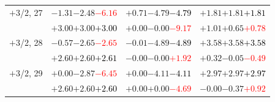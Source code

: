 \documentclass[compress]{beamer}
\begin{document}
\begin{frame}
\begin{tabular}{r | c | c | c}
$+$3/2, 27 & $-1.31$\hspace{0.1 cm}$-2.48$\hspace{0.1 cm}\textcolor{red}{$-6.16$} & $+0.71$\hspace{0.1 cm}$-4.79$\hspace{0.1 cm}\textcolor{black}{$-4.79$} & $+1.81$\hspace{0.1 cm}$+1.81$\hspace{0.1 cm}\textcolor{black}{$+1.81$} \\
           & $+3.00$\hspace{0.1 cm}$+3.00$\hspace{0.1 cm}\textcolor{black}{$+3.00$} & $+0.00$\hspace{0.1 cm}$-0.00$\hspace{0.1 cm}\textcolor{red}{$-9.17$} & $+1.01$\hspace{0.1 cm}$+0.65$\hspace{0.1 cm}\textcolor{red}{$+0.78$} \\
$+$3/2, 28 & $-0.57$\hspace{0.1 cm}$-2.65$\hspace{0.1 cm}\textcolor{red}{$-2.65$} & $-0.01$\hspace{0.1 cm}$-4.89$\hspace{0.1 cm}\textcolor{black}{$-4.89$} & $+3.58$\hspace{0.1 cm}$+3.58$\hspace{0.1 cm}\textcolor{black}{$+3.58$} \\
           & $+2.60$\hspace{0.1 cm}$+2.60$\hspace{0.1 cm}\textcolor{black}{$+2.61$} & $-0.00$\hspace{0.1 cm}$-0.00$\hspace{0.1 cm}\textcolor{red}{$+1.92$} & $+0.32$\hspace{0.1 cm}$-0.05$\hspace{0.1 cm}\textcolor{red}{$-0.49$} \\
$+$3/2, 29 & $+0.00$\hspace{0.1 cm}$-2.87$\hspace{0.1 cm}\textcolor{red}{$-6.45$} & $+0.00$\hspace{0.1 cm}$-4.11$\hspace{0.1 cm}\textcolor{black}{$-4.11$} & $+2.97$\hspace{0.1 cm}$+2.97$\hspace{0.1 cm}\textcolor{black}{$+2.97$} \\
           & $+2.60$\hspace{0.1 cm}$+2.60$\hspace{0.1 cm}\textcolor{black}{$+2.60$} & $+0.00$\hspace{0.1 cm}$+0.00$\hspace{0.1 cm}\textcolor{red}{$-4.69$} & $-0.00$\hspace{0.1 cm}$-0.37$\hspace{0.1 cm}\textcolor{red}{$+0.92$} \\

\end{tabular}
\end{frame}
\end{document}
